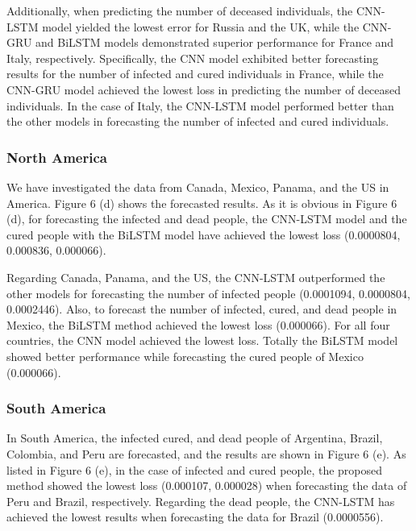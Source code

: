 \documentclass{article}
\begin{document}
Additionally, when predicting the number of deceased individuals, the CNN-LSTM model yielded the lowest error for Russia and the UK, while the CNN-GRU and BiLSTM models demonstrated superior performance for France and Italy, respectively. Specifically, the CNN model exhibited better forecasting results for the number of infected and cured individuals in France, while the CNN-GRU model achieved the lowest loss in predicting the number of deceased individuals. In the case of Italy, the CNN-LSTM model performed better than the other models in forecasting the number of infected and cured individuals.

\subsubsection{North America}
We have investigated the data from Canada, Mexico, Panama, and the US in America. Figure 6 (d) shows the forecasted results. As it is obvious in Figure 6 (d), for forecasting the infected and dead people, the CNN-LSTM model and the cured people with the BiLSTM model have achieved the lowest loss (0.0000804, 0.000836, 0.000066).

Regarding Canada, Panama, and the US, the CNN-LSTM outperformed the other models for forecasting the number of infected people (0.0001094, 0.0000804, 0.0002446). Also, to forecast the number of infected, cured, and dead people in Mexico, the BiLSTM method achieved the lowest loss (0.000066).  For all four countries, the CNN model achieved the lowest loss. Totally the BiLSTM model showed better performance while forecasting the cured people of Mexico (0.000066).

\subsubsection{South America}
In South America, the infected cured, and dead people of Argentina, Brazil, Colombia, and Peru are forecasted, and the results are shown in Figure 6 (e). As listed in Figure 6 (e), in the case of infected and cured people, the proposed method showed the lowest loss (0.000107, 0.000028) when forecasting the data of Peru and Brazil, respectively. Regarding the dead people, the CNN-LSTM has achieved the lowest results when forecasting the data for Brazil (0.0000556).
\end{document}
